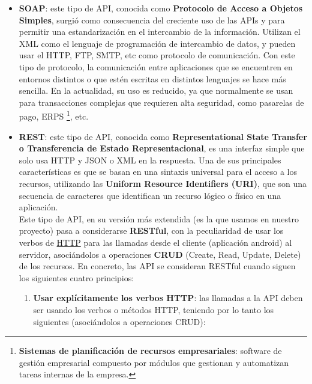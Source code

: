     \begin{itemize}
        \item \textbf{SOAP}: este tipo de API, conocida como \textbf{Protocolo de Acceso a
        Objetos Simples}, surgió como consecuencia del creciente uso de las APIs y para
        permitir una estandarización en el intercambio de la información. Utilizan el XML
        como el lenguaje de programación de intercambio de datos, y pueden usar el HTTP,
        FTP, SMTP, etc como protocolo de comunicación. Con este tipo de protocolo, la
        comunicación entre aplicaciones que se encuentren en entornos distintos o que estén
        escritas en distintos lenguajes se hace más sencilla. En la actualidad, su uso es
        reducido, ya que normalmente se usan para transacciones complejas que requieren
        alta seguridad, como pasarelas de pago, ERPS \footnote{\textbf{Sistemas de
        planificación de recursos empresariales}: software de gestión empresarial compuesto
        por módulos que gestionan y automatizan tareas internas de la empresa.}, etc.

        \item \textbf{REST}: este tipo de API, conocida como \textbf{Representational State
        Transfer o Transferencia de Estado Representacional}, es una interfaz simple que
        solo usa HTTP y JSON o XML en la respuesta. Una de sus principales características
        es que se basan en una sintaxis universal para el acceso a los recursos, utilizando
        las \textbf{Uniform Resource Identifiers (URI)}, que son una secuencia de caracteres
        que identifican un recurso lógico o físico en una aplicación.\\
        
        Este tipo de API, en su versión más extendida (es la que usamos en nuestro proyecto)
        pasa a considerarse \textbf{RESTful}, con la peculiaridad de usar los verbos de
        \href{https://developer.mozilla.org/es/docs/Web/HTTP/Methods}{HTTP} para las
        llamadas desde el cliente (aplicación android) al servidor, asociándolos a
        operaciones \textbf{CRUD} (Create, Read, Update, Delete) de los recursos. En
        concreto, las API se consideran RESTful cuando siguen los siguientes cuatro
        principios:

            \begin{enumerate}
                \item \textbf{Usar explícitamente los verbos HTTP}: las llamadas a la API
                deben ser usando los verbos o métodos HTTP, teniendo por lo tanto los
                siguientes (asociándolos a operaciones CRUD):
                    

\end{enumerate}
\end{itemize}

